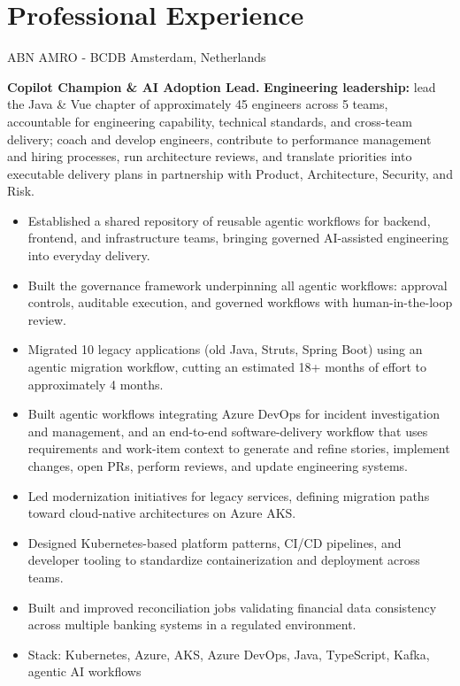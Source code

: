 \documentclass[10pt,a4paper,sans]{moderncv}
\begin{document}
\section{Professional Experience}
{ABN AMRO - BCDB}
{Amsterdam, Netherlands}
{}{\textbf{Copilot Champion \& AI Adoption Lead.} \textbf{Engineering leadership:} lead the Java \& Vue chapter of approximately 45 engineers across 5 teams, accountable for engineering capability, technical standards, and cross-team delivery; coach and develop engineers, contribute to performance management and hiring processes, run architecture reviews, and translate priorities into executable delivery plans in partnership with Product, Architecture, Security, and Risk.
\begin{itemize}
 \item Established a shared repository of reusable agentic workflows for backend, frontend, and infrastructure teams, bringing governed AI-assisted engineering into everyday delivery.
 \item Built the governance framework underpinning all agentic workflows: approval controls, auditable execution, and governed workflows with human-in-the-loop review.
 \item Migrated 10 legacy applications (old Java, Struts, Spring Boot) using an agentic migration workflow, cutting an estimated 18+ months of effort to approximately 4 months.
 \item Built agentic workflows integrating Azure DevOps for incident investigation and management, and an end-to-end software-delivery workflow that uses requirements and work-item context to generate and refine stories, implement changes, open PRs, perform reviews, and update engineering systems.
 \item Led modernization initiatives for legacy services, defining migration paths toward cloud-native architectures on Azure AKS.
 \item Designed Kubernetes-based platform patterns, CI/CD pipelines, and developer tooling to standardize containerization and deployment across teams.
 \item Built and improved reconciliation jobs validating financial data consistency across multiple banking systems in a regulated environment.
 \item Stack: Kubernetes, Azure, AKS, Azure DevOps, Java, TypeScript, Kafka, agentic AI workflows
\end{itemize}
}
\end{document}
